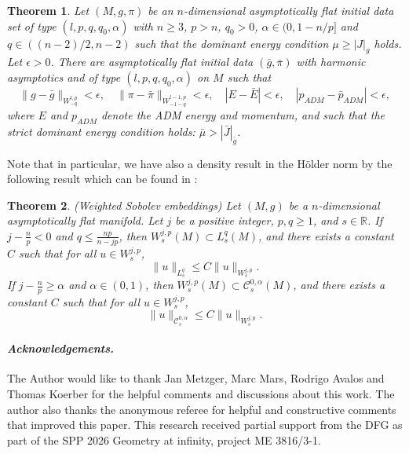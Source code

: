 \documentclass[12pt,a4paper]{amsart}
\theoremstyle{plain}
\newtheorem{theorem}{Theorem}[section]
\theoremstyle{definition}
\begin{document}
\begin{theorem}\label{densitytheo}
    Let $(M, g, \pi)$ be an $n$-dimensional asymptotically flat initial data set of type $(l, p, q, q_0, \alpha)$ with $n\geq3$, $p>n$, $q_0>0$,  $\alpha \in (0 ,1-n/p]  $ and $q \in ((n-2)/2,n-2)$  such that the dominant energy condition $\mu \geq |J|_g$ holds. Let $\epsilon > 0$. There are asymptotically flat initial data $(\bar{g}, \bar{\pi})$ with harmonic asymptotics and of type $(l,p, q, q_0, \alpha)$ on $M$ such that
\[
\|g - \bar{g}\|_{W^{l,p}_{-q}} < \epsilon, \quad \|\pi - \bar{\pi}\|_{W^{l-1,p}_{-1-q}} < \epsilon, \quad |E - \bar{E}| < \epsilon, \quad |p_{ADM} - \bar{p}_{ADM}| < \epsilon,
\]
 where $E$ and $p_{ADM}$ denote the ADM energy and momentum,  and such that the strict dominant energy condition holds: $\bar{\mu} > |\bar{J}|_{\bar{g}}$.
\end{theorem}
Note that in particular, we have also a density result in the Hölder norm by the following result which can be found in \cite[Theorem A.25]{lee2021geometric}:
\begin{theorem}\label{sobolevemb}(Weighted Sobolev embeddings)
    Let $(M, g)$ be a $n$-dimensional  asymptotically flat manifold. Let $j$ be a positive integer, $p, q \geq 1$, and $s \in \mathbb{R}$. If $j - \frac{n}{p} < 0$ and $q \leq \frac{np}{n - jp}$, then $W^{j,p}_s(M) \subset L^q_s(M)$, and there exists a constant $C$ such that for all $u \in W^{j,p}_s$,
\[
\|u\|_{L^q_s} \leq C \|u\|_{W^{j,p}_s}.
\]
If $j - \frac{n}{p} \geq \alpha$ and $\alpha \in (0, 1)$, then $W^{j,p}_s(M) \subset \mathcal{C}^{0,\alpha}_s(M)$, and there exists a constant $C$ such that for all $u \in W^{j,p}_s$,
\[
\|u\|_{\mathcal{C}^{0,\alpha}_s} \leq C \|u\|_{W^{j,p}_s}.
\]
\end{theorem}





\vspace{1.5 cm}




 \paragraph*{\emph{Acknowledgements.}} The Author would like to thank Jan Metzger, Marc Mars, Rodrigo Avalos and Thomas Koerber for the helpful comments and discussions about this work. The author also thanks the anonymous referee for  helpful and constructive comments that improved this paper. This research received partial support from the DFG as part of the SPP 2026 Geometry at infinity, project ME 3816/3-1.
  





\end{document}
